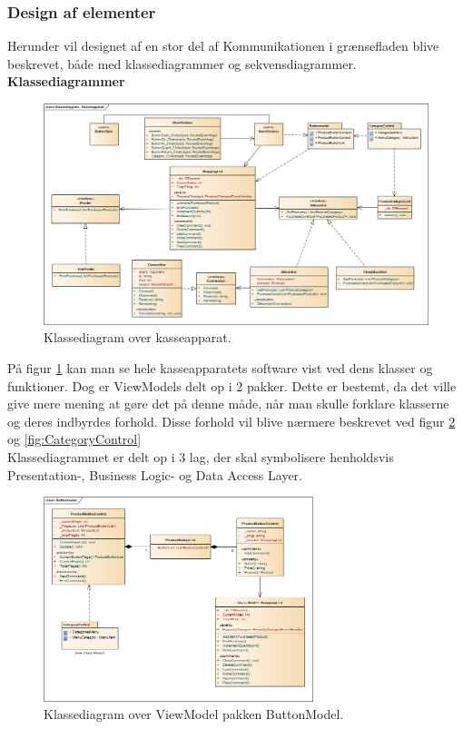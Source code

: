 \subsubsection{Design af elementer}
Herunder vil designet af en stor del af Kommunikationen i grænsefladen blive beskrevet, både med klassediagrammer og sekvensdiagrammer.\\

\textbf{Klassediagrammer}\\

\begin{figure}[H]
	\centering
	\includegraphics[width=1.2\textwidth, angle=90]{Systemdesign/Frontend/GUI/DesignOgStruktur/Pics/KlassediagramKasseApparat}
	\caption{Klassediagram over kasseapparat.}
	\label{fig:KasseKlasse}
\end{figure}

På figur \ref{fig:KasseKlasse} kan man se hele kasseapparatets software vist ved dens klasser og funktioner. Dog er ViewModels delt op i 2 pakker. Dette er bestemt, da det ville give mere mening at gøre det på denne måde, når man skulle forklare klasserne og deres indbyrdes forhold. Disse forhold vil blive nærmere beskrevet ved figur \ref{fig:ButtonModel} og \ref{fig:CategoryControl} \\
Klassediagrammet er delt op i 3 lag, der skal symbolisere henholdsvis Presentation-, Business Logic- og Data Access Layer.

\begin{figure}[H]
	\centering
	\includegraphics[width=0.7\textwidth]{Systemdesign/Frontend/GUI/DesignOgStruktur/Pics/KlassediagramButtonModel}
	\caption{Klassediagram over ViewModel pakken ButtonModel.}
	\label{fig:ButtonModel}
\end{figure}

